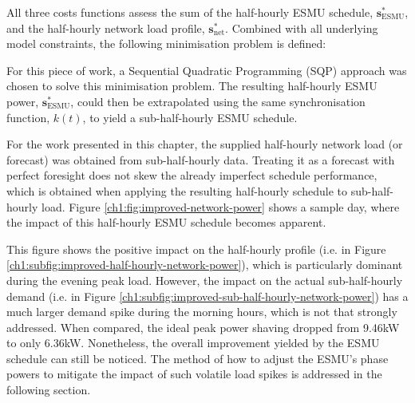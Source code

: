 All three costs functions assess the sum of the half-hourly ESMU schedule, $\textbf{s}^*_\text{ESMU}$, and the half-hourly network load profile, $\textbf{s}^*_\text{net}$.
Combined with all underlying model constraints, the following minimisation problem is defined:



For this piece of work, a Sequential Quadratic Programming (SQP) approach was chosen to solve this minimisation problem.
The resulting half-hourly ESMU power, $\textbf{s}^*_\text{ESMU}$, could then be extrapolated using the same synchronisation function, $k(t)$, to yield a sub-half-hourly ESMU schedule.

For the work presented in this chapter, the supplied half-hourly network load (or forecast) was obtained from sub-half-hourly data.
Treating it as a forecast with perfect foresight does not skew the already imperfect schedule performance, which is obtained when applying the resulting half-hourly schedule to sub-half-hourly load.
Figure \ref{ch1:fig:improved-network-power} shows a sample day, where the impact of this half-hourly ESMU schedule becomes apparent.



This figure shows the positive impact on the half-hourly profile (i.e. in Figure \ref{ch1:subfig:improved-half-hourly-network-power}), which is particularly dominant during the evening peak load.
However, the impact on the actual sub-half-hourly demand (i.e. in Figure \ref{ch1:subfig:improved-sub-half-hourly-network-power}) has a much larger demand spike during the morning hours, which is not that strongly addressed.
When compared, the ideal peak power shaving dropped from 9.46kW to only 6.36kW.
Nonetheless, the overall improvement yielded by the ESMU schedule can still be noticed. 
The method of how to adjust the ESMU's phase powers to mitigate the impact of such volatile load spikes is addressed in the following section.

